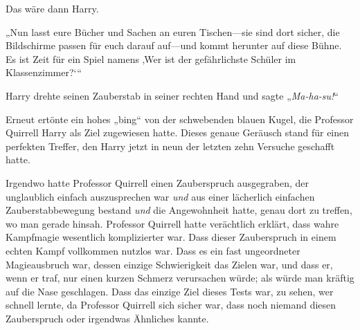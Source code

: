 Das wäre dann Harry.

„Nun lasst eure Bücher und Sachen an euren Tischen—sie sind dort sicher, die Bildschirme passen für euch darauf auf—und kommt herunter auf diese Bühne. Es ist Zeit für ein Spiel namens ‚Wer ist der gefährlichste Schüler im Klassenzimmer?‘“

\later

Harry drehte seinen Zauberstab in seiner rechten Hand und sagte „\emph{Ma-ha-su!}“

Erneut ertönte ein hohes „bing“ von der schwebenden blauen Kugel, die Professor Quirrell Harry als Ziel zugewiesen hatte. Dieses genaue Geräusch stand für einen perfekten Treffer, den Harry jetzt in neun der letzten zehn Versuche geschafft hatte.

Irgendwo hatte Professor Quirrell einen Zauberspruch ausgegraben, der unglaublich einfach auszusprechen war \emph{und} aus einer lächerlich einfachen Zauberstabbewegung bestand \emph{und} die Angewohnheit hatte, genau dort zu treffen, wo man gerade hinsah. Professor Quirrell hatte verächtlich erklärt, dass wahre Kampfmagie wesentlich komplizierter war. Dass dieser Zauberspruch in einem echten Kampf vollkommen nutzlos war. Dass es ein fast ungeordneter Magieausbruch war, dessen einzige Schwierigkeit das Zielen war, und dass er, wenn er traf, nur einen kurzen Schmerz verursachen würde; als würde man kräftig auf die Nase geschlagen. Dass das einzige Ziel dieses Tests war, zu sehen, wer schnell lernte, da Professor Quirrell sich sicher war, dass noch niemand diesen Zauberspruch oder irgendwas Ähnliches kannte.

